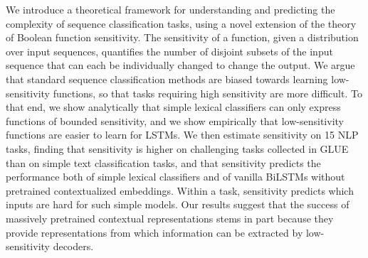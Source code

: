 We introduce a theoretical framework for understanding and predicting the complexity of sequence classification tasks, using a novel extension of the theory of Boolean function sensitivity. The sensitivity of a function, given a distribution over input sequences, quantifies the number of disjoint subsets of the input sequence that can each be individually changed to change the output. We argue that standard sequence classification methods are biased towards learning low-sensitivity functions, so that tasks requiring high sensitivity are more difficult. To that end, we show analytically that simple lexical classifiers can only express functions of bounded sensitivity, and we show empirically that low-sensitivity functions are easier to learn for LSTMs. We then estimate sensitivity on 15 NLP tasks, finding that sensitivity is higher on challenging tasks collected in GLUE than on simple text classification tasks, and that sensitivity predicts the performance both of simple lexical classifiers and of vanilla BiLSTMs without pretrained contextualized embeddings. Within a task, sensitivity predicts which inputs are hard for such simple models. Our results suggest that the success of massively pretrained contextual representations stems in part because they provide representations from which information can be extracted by low-sensitivity decoders.
